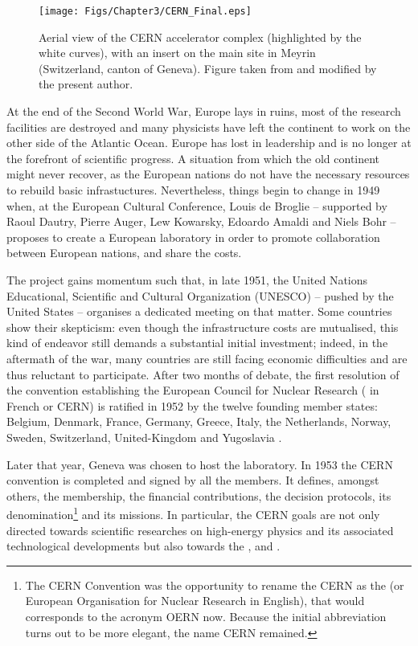 \begin{figure}[t]
	\centering
	\texttt{[image: Figs/Chapter3/CERN\_Final.eps]}
	\caption{Aerial view of the CERN accelerator complex (highlighted by the white curves), with an insert on the main site in Meyrin (Switzerland, canton of Geneva). Figure taken from \cite{cernPuzzleGrandCollisionneur2023} and modified by the present author.}
	\label{fig:CERNView}
\end{figure}

At the end of the Second World War, Europe lays in ruins, most of the research facilities are destroyed and many physicists have left the continent to work on the other side of the Atlantic Ocean. Europe has lost in leadership and is no longer at the forefront of scientific progress. A situation from which the old continent might never recover, as the European nations do not have the necessary resources to rebuild basic infrastuctures. Nevertheless, things begin to change in 1949 when, at the European Cultural Conference, Louis de Broglie -- supported by Raoul Dautry, Pierre Auger, Lew Kowarsky, Edoardo Amaldi and Niels Bohr -- proposes to create a European laboratory in order to promote collaboration between European nations, and share the costs.

The project gains momentum such that, in late 1951, the United Nations Educational, Scientific and Cultural Organization (UNESCO) -- pushed by the United States -- organises a dedicated meeting on that matter. Some countries show their skepticism: even though the infrastructure costs are mutualised, this kind of endeavor still demands a substantial initial investment; indeed, in the aftermath of the war, many countries are still facing economic difficulties and are thus reluctant to participate. After two months of debate, the first resolution of the convention establishing the European Council for Nuclear Research ( in French or CERN) is ratified in 1952 by the twelve founding member states: Belgium, Denmark, France, Germany, Greece, Italy, the Netherlands, Norway, Sweden, Switzerland, United-Kingdom and Yugoslavia \cite{deroseParis1951Birth2008}.

Later that year, Geneva was chosen to host the laboratory. In 1953 the CERN convention is completed and signed by all the members. It defines, amongst others, the membership, the financial contributions, the decision protocols, its denomination\footnote{The CERN Convention was the opportunity to rename the CERN as the  (or European Organisation for Nuclear Research in English), that would corresponds to the acronym OERN now. Because the initial abbreviation turns out to be more elegant, the name CERN remained.} and its missions. In particular, the CERN goals are not only directed towards scientific researches on high-energy physics and its associated technological developments but also towards the , and  \cite{cerncouncilConventionEstablishmentEuropean1953}.\\

